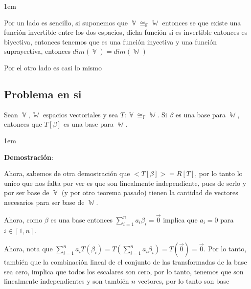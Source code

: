 \documentclass[12pt, fleqn]{article}                             %
\newenvironment{SmallIndentation}[1][0.75em]                    %
        {\begin{adjustwidth}{#1}{}\begin{footnotesize}}             %
        {\end{footnotesize}\end{adjustwidth}}                       %
\theoremstyle{break}                                            %
\DeclareMathOperator \GenericField {\mathbb{F}}                 %
\DeclareMathOperator \VectorSet    {\mathbb{V}}                 %
\DeclareMathOperator \SubVectorSet {\mathbb{W}}                 %
\begin{document}
\begin{itemize}
\begin{SmallIndentation}[1em]
                    Por un lado es sencillo, si suponemos que $\VectorSet \cong_{\GenericField} \SubVectorSet$
                    entonces se que existe una función invertible entre los dos espacios, dicha
                    función si es invertible entonces es biyectiva, entonces tenemos que
                    es una función inyectiva y una función suprayectiva, entonces
                    $dim(\VectorSet) = dim(\SubVectorSet)$

                    Por el otro lado es casi lo mismo
                
                \end{SmallIndentation}



        \end{itemize}

    \vspace{1em}
    \subsection{Problema en si}

        Sean $\VectorSet, \SubVectorSet$ espacios vectoriales y sea 
        $T: \VectorSet \cong_{\GenericField} \SubVectorSet$. Si $\beta$ es una base
        para $\SubVectorSet$, entonces que $T[\beta]$ es una base para $\SubVectorSet$.

        \begin{SmallIndentation}[1em]
            \textbf{Demostración}:
            
            Ahora, sabemos de otra demostración que $<T[\beta]> = R[T]$, por lo tanto lo unico que nos
            falta por ver es que son linealmente independiente, pues de serlo y por ser base de $\VectorSet$
            (y por otro teorema pasado) tienen la cantidad de vectores necesarios para ser base
            de $\SubVectorSet$.

            Ahora, como $\beta$ es una base entonces $\sum_{i=1}^n a_i \beta_i = \vec 0$ implica
            que $a_i = 0$ para $i \in [1, n]$.

            Ahora, nota que $\sum_{i=1}^n a_i T(\beta_i) = T(\sum_{i=1}^n a_i \beta_i) = T(\vec 0) = \vec 0$.
            Por lo tanto, también que la combinación lineal de el conjunto de las transformadas de la base
            sea cero, implica que todos los escalares son cero, por lo tanto, tenemos que son linealmente
            independientes y son también $n$ vectores, por lo tanto son base  
        
        \end{SmallIndentation}
\end{document}
